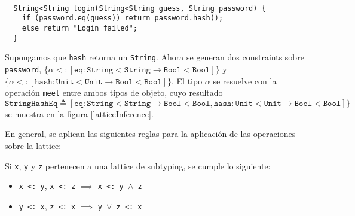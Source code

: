 \begin{ej} \ \\
  \normalfont
  \label{ej2-5}
\begin{lstlisting}
  String<String login(String<String guess, String password) {
  	if (password.eq(guess)) return password.hash();
  	else return "Login failed";
  }
\end{lstlisting}
\end{ej}

Supongamos que \texttt{hash} retorna un \texttt{String}. Ahora se generan dos constraints sobre \texttt{password}, $\{\alpha <: [\mathtt{eq} : \mathtt{String<String} \rightarrow \mathtt{Bool<Bool}]\}$ y $\{\alpha <: [\mathtt{hash} : \mathtt{Unit<Unit} \rightarrow \mathtt{Bool<Bool}]\}$. El tipo $\alpha$ se resuelve con la operación \texttt{meet} entre ambos tipos de objeto, cuyo resultado $\mathtt{StringHashEq} \triangleq [\mathtt{eq} : \mathtt{String<String} \rightarrow \mathtt{Bool<Bool}, \mathtt{hash} : \mathtt{Unit<Unit} \rightarrow \mathtt{Bool<Bool}]\}$ se muestra en la figura \ref{latticeInference}.

En general, se aplican las siguientes reglas para la aplicación de las operaciones sobre la lattice:

\begin{teo} \label{teo1} \normalfont Si \texttt{x}, \texttt{y} y \texttt{z} pertenecen a una lattice de subtyping, se cumple lo siguiente: \\
  \begin{itemize}
    \item \texttt{x <: y}, \texttt{x <: z} $\implies$ \texttt{x <: y }$\wedge$\texttt{ z}
    \item \texttt{y <: x}, \texttt{z <: x} $\implies$ \texttt{y }$\vee$\texttt{ z <: x}
  \end{itemize}
\end{teo}

